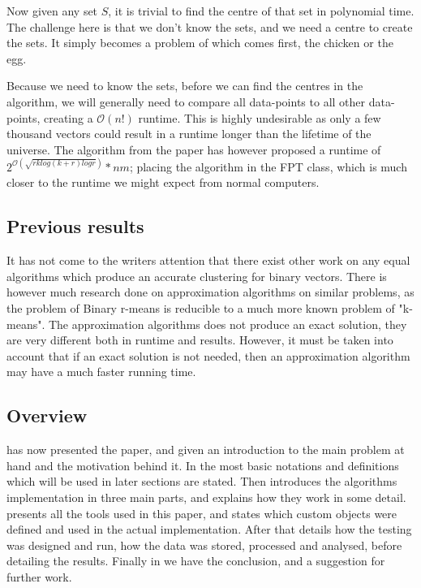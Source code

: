 \documentclass[a4paper]{article}
\begin{document}
Now given any set $S$, it is trivial to find the centre of that set in polynomial time. The challenge
here is that we don't know the sets, and we need a centre to create the sets. It simply becomes a problem
of which comes first, the chicken or the egg.

Because we need to know the sets, before we can find the centres in the algorithm, we will
generally need to compare all data-points to all other data-points, creating a $\mathcal{O}(n!)$ runtime. This
is highly undesirable as only a few thousand vectors could result in a runtime longer than the lifetime
of the universe. The algorithm from the paper \cite{fomin_golovach_panolan_2020} has however proposed a
runtime of $2^{\mathcal{O} (\sqrt{rk log(k+r) logr})}*nm$; placing the algorithm in the FPT class, which is
much closer to the runtime we might expect from normal computers.

\subsection{Previous results}
It has not come to the writers attention that there exist other work on any equal algorithms which produce an
accurate clustering for binary vectors. There is however much research done on approximation algorithms on similar
problems, as the problem of Binary r-means is reducible to a much more known problem of "k-means".
The approximation algorithms does not produce an exact solution, they are very different both in runtime
and results. However, it must be taken into account that if an exact solution is not needed, then an approximation
algorithm may have a much faster running time.
\cite{SimonovKirill2021ACoC,DanChen2015LRAo,zohar:k-means-viability,ibm:support:k-means:opinion}

\subsection{Overview}
 has now presented the paper, and given an introduction to the main problem at hand and the
motivation behind it. In  the most basic notations and definitions which will be used in 
later sections are stated. Then  introduces the algorithms implementation in three main parts, and 
explains how they work in some detail.  presents all the tools used in this paper, and states which 
custom objects were defined and used in the actual implementation. After that  details how the 
testing was designed and run, how the data was stored, processed and analysed, before detailing the results. Finally 
in  we have the conclusion, and a suggestion for further work.
\end{document}
